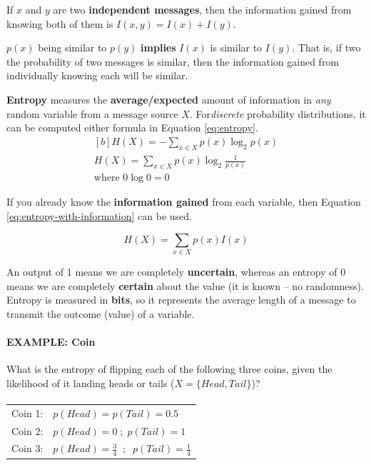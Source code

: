 \documentclass{article}
\begin{document}
If $x$ and $y$ are two \textbf{independent messages}, then the information gained from knowing both of them is $I(x, y) = I(x) + I(y)$.

$p(x)$  being similar to $p(y)$ \textbf{implies} $I(x)$ is similar to $I(y)$. That is, if two the probability of two messages is similar, then the information gained from individually knowing each will be similar.

\textbf{Entropy} measures the \textbf{average/expected} amount of information in \textit{any} random variable from a message source $X$. For\textit{discrete} probability distributions, it can be computed either formula in Equation \ref{eq:entropy}.
\begin{equation}
	\begin{aligned}[b]
		H(X) = -\sum_{x \in X} { p(x) \log_2 p(x) } \\
		H(X) = \sum_{x \in X} { p(x) \log_2 {\frac{1}{p(x)}} } \\
		\text{where }0\log0 = 0
	\end{aligned}
	\label{eq:entropy}
\end{equation}

If you already know the \textbf{information gained} from each variable, then Equation \ref{eq:entropy-with-information} can be used.

\begin{equation}
	H(X) = \sum_{x \in X} { p(x)I(x) }
	\label{eq:entropy-with-information}
\end{equation}

An output of 1 means we are completely \textbf{uncertain}, whereas an entropy of 0 means we are completely \textbf{certain} about the value (it is known -- no randomness). Entropy is measured in \textbf{bits}, so it represents the average length of a message to transmit the outcome (value) of a variable.

\paragraph{\textbf{EXAMPLE: Coin}} What is the entropy of flipping each of the following three coins, given the likelihood of it landing heads or tails ($X = \lbrace Head, Tail \rbrace$)?
\paragraph{}
\begin{tabular}{ll}
	Coin 1: & $p(Head) = p(Tail) = 0.5$ \\
	Coin 2: & $p(Head) = 0 \; ; \; p(Tail) = 1$ \\
	Coin 3: & $p(Head) = \frac{3}{4} \;\; ; \;\; p(Tail) = \frac{1}{4}$ \\
\end{tabular}
\end{document}
